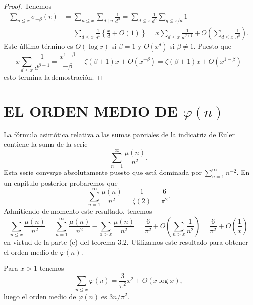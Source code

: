 \documentclass[12pt,a4paper]{book}
\begin{document}
    \begin{proof}
        Tenemos
        \begin{align*}
            \sum_{n\leq x}\sigma_{-\beta}(n)&=\sum_{n\leq x}\sum_{d\mid n}\frac{1}{d^\beta}
            =\sum_{d\leq x}\frac{1}{d^\beta}\sum_{q\leq x/d}1\\
            &=\sum_{d\leq x}\frac{1}{d^\beta}\left\{\frac{x}{d}+O(1)\right\}
            =x\sum_{d\leq x}\frac{1}{d^{\beta+1}}+O\left(\sum_{d\leq x}\frac{1}{d^\beta}\right).
        \end{align*}
        Este último término es $O(\log x)$ si $\beta=1$ y $O(x^\delta)$ si $\beta\neq1$.
        Puesto que
        \begin{equation*}
            x\sum_{d\leq x}\frac{1}{d^{\beta+1}}=\frac{x^{1-\beta}}{-\beta}+\zeta(\beta+1)x+O(x^{-\beta})
            =\zeta(\beta+1)x+O(x^{1-\beta})
        \end{equation*}
        esto termina la demostración.
    \end{proof}

    \section{EL ORDEN MEDIO DE \texorpdfstring{$\varphi(n)$}{φ(n)}}

    La fórmula asintótica relativa a las sumas parciales de la indicatriz de Euler
    contiene la suma de la serie
    \begin{equation*}
        \sum_{n=1}^{\infty}\frac{\mu(n)}{n^2}.
    \end{equation*}
    Esta serie converge absolutamente puesto que está dominada por
    $\sum_{n=1}^{\infty}n^{-2}$. En un capítulo posterior probaremos que
    \begin{equation}
        \sum_{n=1}^{\infty}\frac{\mu(n)}{n^2}=\frac{1}{\zeta(2)}=\frac{6}{\pi^2}.
    \end{equation}
    Admitiendo de momento este resultado, tenemos
    \begin{equation*}
        \sum_{n\leq x}\frac{\mu(n)}{n^2}=\sum_{n=1}^{\infty}\frac{\mu(n)}{n^2}
        -\sum_{n>x}\frac{\mu(n)}{n^2}
        =\frac{6}{\pi^2}+O\left(\sum_{n>x}\frac{1}{n^2}\right)=\frac{6}{\pi^2}+O\left(\frac{1}{x}\right)
    \end{equation*}
    en virtud de la parte (c) del teorema 3.2. Utilizamos este resultado para obtener el
    orden medio de $\varphi(n)$.

    \begin{teorema}
        Para $x>1$ tenemos
        \begin{equation}
            \sum_{n\leq x}\varphi(n)=\frac{3}{\pi^2}x^2+O(x\log x),
        \end{equation}
        luego el orden medio de $\varphi(n)$ es $3n/\pi^2$.
    \end{teorema}
\end{document}
